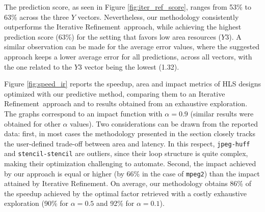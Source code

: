 \documentclass[]{usiinfthesis}
\newcommand{\ItRef}{{Iterative Refinement}}
\newcommand{\mpeg}{\texttt{mpeg2}}
\begin{document}
The prediction score, as seen in Figure \ref{fig:iter_ref_score}, ranges from 53\% to 63\% across the three 
$Y$ vectors. Nevertheless, our methodology consistently outperforms the \ItRef\ approach, while achieving 
the highest prediction score (63\%) for the setting that favors low area resources ($Y3$). A similar
observation can be made for the average error values, where the suggested approach keeps a lower 
average error for all predictions, across all vectors, with the one related to the $Y3$ vector 
being the lowest (1.32).\par

Figure \ref{fig:speed_ir} reports the speedup, area and impact metrics of HLS designs
optimized with our predictive method, comparing them to an \ItRef\ approach and to results obtained
from an exhaustive exploration. 
The graphs correspond to an impact function with $\alpha = 0.9$ 
(similar results were obtained for other $\alpha$ values). Two considerations can be drawn from the reported data: first, in most cases the methodology presented in the section
closely tracks the user-defined trade-off between area and latency. In this respect,
\texttt{jpeg-huff} and \texttt{stencil-stencil} are outliers, since their loop structure is quite complex,
making their optimization challenging to automate. Second,
the impact achieved by our approach is equal or higher (by 66\% in the case of \mpeg) than the
impact attained by \ItRef. On average, our methodology obtains 86\%
of the speedup achieved by the optimal factor retrieved with
a costly exhaustive exploration (90\% for $\alpha = 0.5$  and 92\% for
$\alpha = 0.1$).
\end{document}

